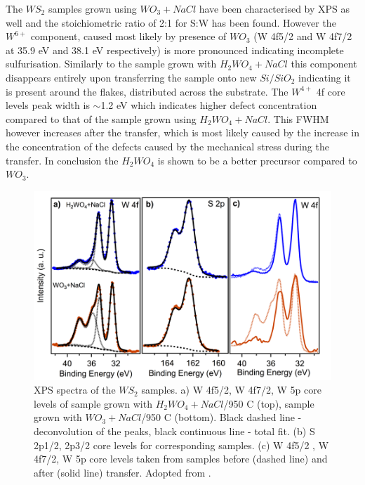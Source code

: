The $WS_2$ samples grown using $WO_3 + NaCl$ have been characterised by XPS as well and the stoichiometric ratio of 2:1 for S:W has been found. However the $W^{6+}$ component, caused most likely by presence of $WO_3$ (W 4f5/2 and W 4f7/2 at 35.9 eV and 38.1 eV respectively) is more pronounced indicating incomplete sulfurisation. Similarly to the sample grown with $H_2WO_4 + NaCl$ this component disappears entirely upon transferring the sample onto new $Si/SiO_2$ indicating it is present around the flakes, distributed across the substrate. The $W^{4+}$ 4f core levels peak width is {$\sim$}1.2 eV which indicates higher defect concentration compared to that of the sample grown using $H_2WO_4 + NaCl$. This FWHM however increases after the transfer, which is most likely caused by the increase in the concentration of the defects caused by the mechanical stress during the transfer. In conclusion the $H_2WO_4$ is shown to be a better precursor compared to $WO_3$.
 
\begin{figure}[h]
	\begin{center}
		\includegraphics[scale=0.3]{PaperXPS.png}
		\caption{XPS spectra of the $WS_2$ samples. a) W 4f5/2, W 4f7/2, W 5p core levels of sample grown with $H_2WO_4+NaCl$/950 {\degree}C (top), sample grown with $WO_3+NaCl$/950 {\degree}C (bottom). Black dashed line - deconvolution of the peaks, black continuous line - total fit. (b) S 2p1/2, 2p3/2 core levels for corresponding samples. (c) W 4f5/2 , W 4f7/2, W 5p core levels taken from samples before (dashed line) and after (solid line) transfer. Adopted from \cite{Reale2017}.}
		\label{fig:PaperXPS}
	\end{center}
\end{figure}

